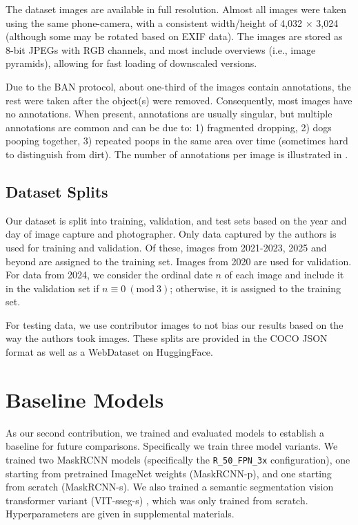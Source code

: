 \documentclass{article}
\begin{document}
The dataset images are available in full resolution.
Almost all images were taken using the same phone-camera, with a consistent width/height of 4,032
  $\times$ 3,024 (although some may be rotated based on EXIF data).
The images are stored as 8-bit JPEGs with RGB channels, and most include overviews (i.e., image pyramids),
  allowing for fast loading of downscaled versions.


Due to the BAN protocol, about one-third of the images contain
annotations, the rest were taken after the object(s) were removed.  Consequently, most
images have no annotations. When present, annotations are usually singular, but
multiple annotations are common and can be due to:
1) fragmented dropping,
2) dogs pooping together,
3) repeated poops in the same area over time (sometimes hard to distinguish from dirt).
The number of annotations per image is illustrated in .


\subsection{Dataset Splits}

Our dataset is split into training, validation, and test sets based on the year and day of image capture and
  photographer.
Only data captured by the authors is used for training and validation.
Of these, images from 2021-2023, 2025 and beyond are assigned to the training set. 
Images from 2020 are used for
  validation.
For data from 2024, we consider the ordinal date $n$ of each image and include it in the validation set if
  $n \equiv 0 \ (\textrm{mod}\ 3)$; otherwise, it is assigned to the training set.


For testing data, we use contributor images to not bias our results based on the way the authors took
  images.
These splits are provided in the COCO JSON format \cite{lin_microsoft_2014} as well as a WebDataset
  \cite{huggingfacewebdataset} on HuggingFace.

\section{Baseline Models}
\label{sec:models}

As our second contribution, we trained and evaluated models to establish a baseline for future comparisons.
Specifically we train three model variants.
We trained two MaskRCNN \cite{he2017mask} models (specifically the \texttt{R\_50\_FPN\_3x} configuration),
  one starting from pretrained ImageNet weights (MaskRCNN-p), and one starting from scratch
  (MaskRCNN-s).
We also trained a semantic segmentation vision transformer variant (VIT-sseg-s)
  \cite{Greenwell_2024_WACV,crall_geowatch_2024}, which was only trained from scratch.
Hyperparameters are given in supplemental materials.
\end{document}
